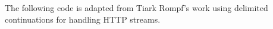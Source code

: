 The following code is adapted from Tiark Rompf's work using delimited
continuations for handling HTTP streams.